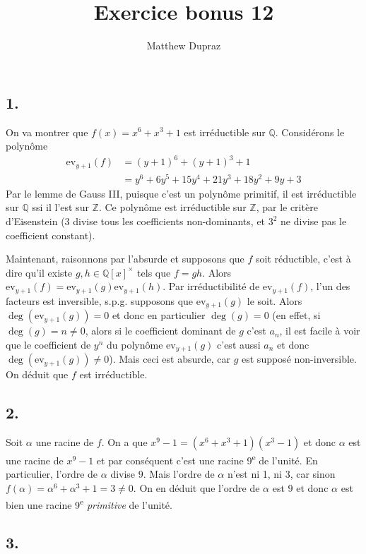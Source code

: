 \documentclass{article}
\author{Matthew Dupraz}
\title{Exercice bonus 12}
\newcommand{\Q}{\mathbb{Q}}
\newcommand{\Z}{\mathbb{Z}}
\newcommand{\ev}{\mathrm{ev}}
\newcommand{\ts}{\textsuperscript}
\begin{document}
\maketitle

\subsection*{1.}

On va montrer que $f(x) = x^6 + x^3 + 1$ est irréductible sur $\Q$.
Considérons le polynôme 
\begin{align*}
	\ev_{y+1}(f) &= (y+1)^6 + (y+1)^3 + 1\\
	&= y^6 + 6y^5 + 15y^4 + 21y^3 + 18y^2 + 9y + 3
\end{align*}
Par le lemme de Gauss III, puisque c'est un polynôme primitif, il est
irréductible sur $\Q$ ssi il l'est sur $\Z$. Ce polynôme est irréductible sur
$\Z$, par le critère d'Eisenstein ($3$ divise tous les coefficients
non-dominants, et $3^2$ ne divise pas le coefficient constant).

Maintenant, raisonnons par l'absurde et supposons que $f$ soit réductible,
c'est à dire qu'il existe $g, h \in \Q[x]^\times$ tels que $f = gh$.
Alors $\ev_{y+1}(f) = \ev_{y+1}(g)\ev_{y+1}(h)$. Par irréductibilité de
$\ev_{y+1}(f)$, l'un des facteurs est inversible, s.p.g. supposons que
$\ev_{y+1}(g)$ le soit. Alors $\deg(\ev_{y+1}(g)) = 0$ et donc en
particulier $\deg(g) = 0$ (en effet, si $\deg(g) = n \neq 0$, alors
si le coefficient dominant de $g$ c'est $a_n$, il est facile à voir que
le coefficient de $y^n$ du polynôme $\ev_{y+1}(g)$ c'est aussi $a_n$ et donc
$\deg(\ev_{y+1}(g)) \neq 0$). Mais ceci est absurde, car $g$ est supposé
non-inversible. On déduit que $f$ est irréductible.

\subsection*{2.}

Soit $\alpha$ une racine de $f$.
On a que $x^9 - 1 = (x^6 + x^3 + 1)(x^3 - 1)$ et donc $\alpha$ est une racine
de $x^9 - 1$ et par conséquent c'est une racine 9\ts{e} de l'unité.
En particulier,
l'ordre de $\alpha$ divise $9$. Mais l'ordre de $\alpha$ n'est ni 1, ni 3,
car sinon $f(\alpha) = \alpha^6 + \alpha^3 + 1 = 3 \neq 0$. On en déduit que
l'ordre de $\alpha$ est $9$ et donc $\alpha$ est bien une racine 9\ts{e}
\emph{primitive} de l'unité. 

\subsection*{3.}
\end{document}
